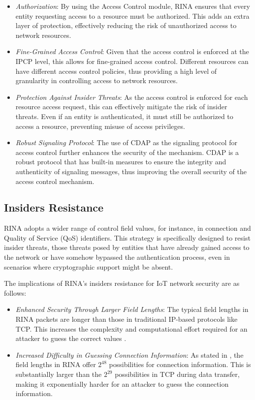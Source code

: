 \documentclass{ieeeaccess}
\begin{document}
\begin{itemize}
	\item \textit{Authorization}: By using the Access Control module, RINA ensures that every entity requesting access to a resource must be authorized. This adds an extra layer of protection, effectively reducing the risk of unauthorized access to network resources.
	\item \textit{Fine-Grained Access Control}: Given that the access control is enforced at the IPCP level, this allows for fine-grained access control. Different resources can have different access control policies, thus providing a high level of granularity in controlling access to network resources.
	\item \textit{Protection Against Insider Threats}: As the access control is enforced for each resource access request, this can effectively mitigate the risk of insider threats. Even if an entity is authenticated, it must still be authorized to access a resource, preventing misuse of access privileges.
	\item \textit{Robust Signaling Protocol}: The use of CDAP as the signaling protocol for access control further enhances the security of the mechanism. CDAP is a robust protocol that has built-in measures to ensure the integrity and authenticity of signaling messages, thus improving the overall security of the access control mechanism.
\end{itemize}

\subsection{Insiders Resistance}

RINA adopts a wider range of control field values, for instance, in connection and Quality of Service (QoS) identifiers. This strategy is specifically designed to resist insider threats, those threats posed by entities that have already gained access to the network or have somehow bypassed the authentication process, even in scenarios where cryptographic support might be absent.

The implications of RINA's insiders resistance for IoT network security are as follows:

\begin{itemize}
	\item \textit{Enhanced Security Through Larger Field Lengths}: The typical field lengths in RINA packets are longer than those in traditional IP-based protocols like TCP. This increases the complexity and computational effort required for an attacker to guess the correct values \cite{small2012}.
	\item \textit{Increased Difficulty in Guessing Connection Information}: As stated in \cite{boddapati2012assessing}, the field lengths in RINA offer $2^{48}$ possibilities for connection information. This is substantially larger than the $2^{29}$ possibilities in TCP during data transfer, making it exponentially harder for an attacker to guess the connection information.

\end{itemize}
\end{document}
